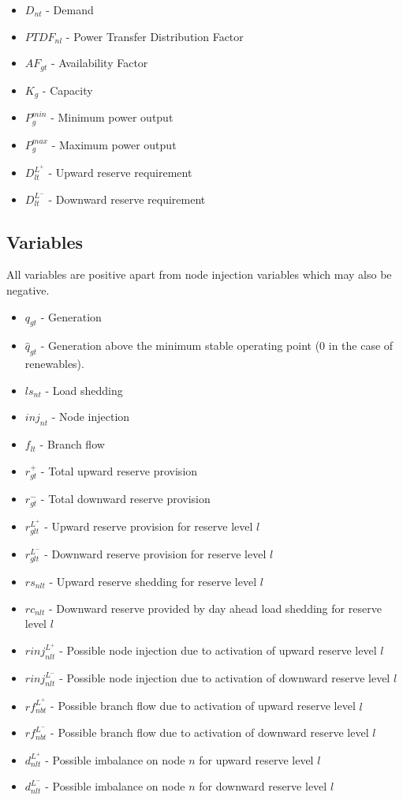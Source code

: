 \documentclass[number,times]{elsarticle}
\begin{document}
\begin{itemize}
    \item $D_{nt}$ - Demand
    \item $PTDF_{nl}$ - Power Transfer Distribution Factor
    \item $AF_{gt}$ - Availability Factor
    \item $K_g$ - Capacity
    \item $P^{min}_g$ - Minimum power output
    \item $P^{max}_g$ - Maximum power output
    \item $D^{L^+}_{lt}$ - Upward reserve requirement
    \item $D^{L^-}_{lt}$ - Downward reserve requirement
\end{itemize}

\subsection{Variables}

All variables are positive apart from node injection variables which may also be negative.

\begin{itemize}
    \item $q_{gt}$ - Generation
    \item $\hat{q}_{gt}$ - Generation above the minimum stable operating point (0 in the case of renewables).
    \item $ls_{nt}$ - Load shedding
    \item $inj_{nt}$ - Node injection
    \item $f_{lt}$ - Branch flow
    \item $r^+_{gt}$ - Total upward reserve provision
    \item $r^-_{gt}$ - Total downward reserve provision
    \item $r^{L^+}_{glt}$ - Upward reserve provision for reserve level $l$
    \item $r^{L^-}_{glt}$ - Downward reserve provision for reserve level $l$
    \item $rs_{nlt}$ - Upward reserve shedding for reserve level $l$
    \item $rc_{nlt}$ - Downward reserve provided by day ahead load shedding for reserve level $l$
    \item $rinj_{nlt}^{L^+}$ - Possible node injection due to activation of upward reserve level $l$
    \item $rinj_{nlt}^{L^-}$ - Possible node injection due to activation of downward reserve level $l$
    \item $rf_{nbt}^{L^+}$ - Possible branch flow due to activation of upward reserve level $l$
    \item $rf_{nbt}^{L^-}$ - Possible branch flow due to activation of downward reserve level $l$
    \item $d_{nlt}^{L^+}$ - Possible imbalance on node $n$ for upward reserve level $l$
    \item $d_{nlt}^{L^-}$ - Possible imbalance on node $n$ for downward reserve level $l$
\end{itemize}
\end{document}
